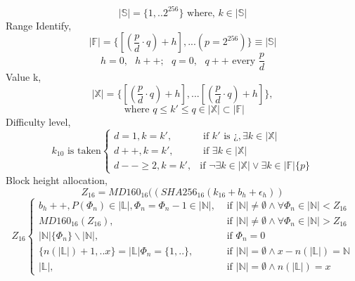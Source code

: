 \documentclass[a4paper,10pt]{article}
\begin{document}
\begin{equation*}
|\mathbb{S}|= \{1,..2^{256}\} \text{ where, } k \in |\mathbb{S}|
\end{equation*}
\noindent Range Identify,
\begin{equation*}
|\mathbb{F}| = \{[(\frac{p}{d} \cdot q)+h],...(p=2^{256})\} \equiv |\mathbb{S}|
\end{equation*}
\begin{equation*}
h = 0, \text{ } h++ ;\text{ } q = 0, \text{ } q++ \text{ every } \frac{p}{d}
\end{equation*}
Value k,
\begin{equation*}
|\mathbb{X}| = \{[(\frac{p}{d} \cdot q)+h],...[(\frac{p}{d} \cdot q)+h]\}, 
\end{equation*}
\begin{equation*}
\text{ where } q \leq k' \leq q \in |\mathbb{X}|\subset |\mathbb{F}|
\end{equation*}
Difficulty level,
\begin{equation*}
k_{10} \text{ is taken} \begin{cases}
d = 1, k=k' ,     & \text{ if } k' \text{ is } ¿, \exists k \in |\mathbb{X}| \\
d++, k=k' ,       & \text{ if } \exists k \in |\mathbb{X}|\\
d-- \geq 2, k=k', & \text{if } \neg \exists k \in |\mathbb{X}| \vee \exists k \in |\mathbb{F}|\{p\}
\end{cases}
\end{equation*}
Block height allocation,
\begin{equation*}
Z_{16} = MD160_{16}((SHA256_{16}(k_{16}+b_h+\epsilon_h))
\end{equation*}
\begin{equation*}
Z_{16}
\begin{cases}
b_h++, P(\Phi_n) \in |\mathbb{L}|, \Phi_n = \Phi_n-1 \in |\mathbb{N}|,   &  \text{ if } |\mathbb{N}| \neq \emptyset \wedge \forall \Phi_n \in |\mathbb{N}| < Z_{16} \\
MD160_{16}(Z_{16}),  & \text{ if } |\mathbb{N}| \neq \emptyset \wedge \forall \Phi_n \in |\mathbb{N}| > Z_{16} \\
|\mathbb{N}| \{\Phi_n\} \backslash  |\mathbb{N}|, & \text{ if } \Phi_n=0\\
\{n(|\mathbb{L}|)+1,..x\}=|\mathbb{L}|\Phi_n =\{1,..\},  & \text{ if } |\mathbb{N}| = \emptyset  \wedge x-n(|\mathbb{L}|)=\mathbb{N}\\
|\mathbb{L}|,   & \text{ if } |\mathbb{N}| = \emptyset \wedge n(|\mathbb{L}|)=x
\end{cases}
\end{equation*}
\end{document}
